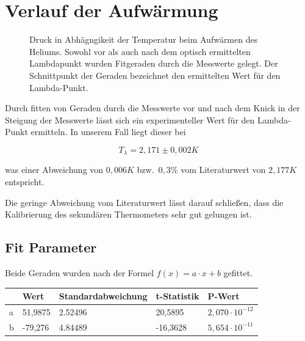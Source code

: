 \documentclass[bigchapter,colorback,accentcolor=tud4b,linedtoc,11pt]{tudreport}
\begin{document}
\section{Verlauf der Aufwärmung}
\begin{figure}[H]
    \caption{Druck in Abhägngikeit der Temperatur beim Aufwärmen des
      Heliums. Sowohl vor als auch nach dem optisch ermittelten Lambdapunkt
      wurden Fitgeraden durch die Messwerte gelegt. Der Schnittpunkt der Geraden
      bezeichnet den ermittelten Wert für den Lambda-Punkt.}
\end{figure}

Durch fitten von Geraden durch die Messwerte vor und nach dem Knick in der
Steigung der Messwerte lässt sich ein experimenteller Wert für den Lambda-Punkt
ermitteln. In unserem Fall liegt dieser bei 

\color{blue}

$$T_{\lambda}=2,171 \pm 0,002K$$

was einer Abweichung von $0,006K$ bzw.\ $0,3\%$ vom Literaturwert von
$2,177K$ entspricht.

\color{black}

Die geringe Abweichung vom Literaturwert lässt darauf schließen, dass die
Kalibrierung des sekundären Thermometers sehr gut gelungen ist.

\subsection{Fit Parameter}
Beide Geraden wurden nach der Formel $f(x) = a \cdot x + b$ gefittet.
\begin{center}
  \begin{tabular}{l|llll}
      & Wert & Standardabweichung & t-Statistik & P-Wert                \\ \hline
    a & 51,9875  & 2.52496        & 20,5895     & $2,070 \cdot 10^{-12}$ \\
    b & -79,276  & 4.84489        & -16,3628    & $5,654 \cdot 10^{-11}$ \\
  \end{tabular}
\end{center}
\end{document}
